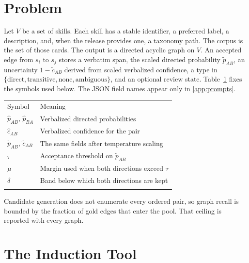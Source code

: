 \documentclass{ws-ijait}
\newcommand{\phat}{\hat{p}}
\newcommand{\chat}{\hat{c}}
\begin{document}
\section{Problem}
\label{sec:problem}
Let $V$ be a set of skills.
Each skill has a stable identifier, a preferred label, a
description, and, when the release provides one, a taxonomy path.
The corpus is the set of those cards.
The output is a directed acyclic graph on $V$.
An accepted edge from $s_i$ to $s_j$ stores a verbatim span, the
scaled directed probability $\tilde{p}_{AB}$, an uncertainty
$1-\tilde{c}_{AB}$ derived from scaled verbalized confidence, a
type in $\{\mathrm{direct},\mathrm{transitive},\mathrm{none},
\mathrm{ambiguous}\}$, and an optional review state.
Table~\ref{tab:notation} fixes the symbols used below.
The {JSON} field names appear only in \ref{app:prompts}.

\begin{table}[th]
{\begin{tabular}{@{}ll@{}}
\toprule
Symbol & Meaning \\
\colrule
$\phat_{AB}$, $\phat_{BA}$ & Verbalized directed probabilities \\
$\chat_{AB}$ & Verbalized confidence for the pair \\
$\tilde{p}_{AB}$, $\tilde{c}_{AB}$ & The same fields after temperature scaling \\
$\tau$ & Acceptance threshold on $\tilde{p}_{AB}$ \\
$\mu$ & Margin used when both directions exceed $\tau$ \\
$\delta$ & Band below which both directions are kept \\
\botrule
\end{tabular}}
\label{tab:notation}
\end{table}

Candidate generation does not enumerate every ordered pair, so
graph recall is bounded by the fraction of gold edges that enter
the pool.
That ceiling is reported with every graph.

\section{The Induction Tool}
\label{sec:tool}
\end{document}
